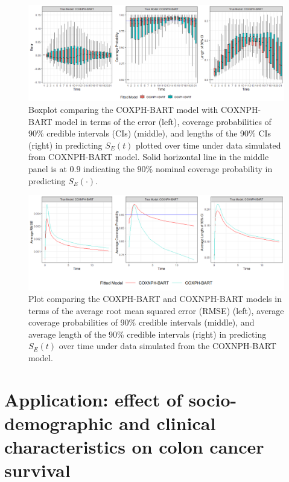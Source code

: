 \documentclass[12pt]{article}
\begin{document}
\begin{figure}
     \centering
     \includegraphics[width=\textwidth]{NPH_Boxplots.png}
     \caption{Boxplot comparing the COXPH-BART model with COXNPH-BART model in terms of the error (left),  coverage probabilities of 90\% credible intervals (CIs)  (middle), and lengths of the 90\% CIs (right) in predicting $S_E(t)$ plotted over time under data simulated from COXNPH-BART model. Solid horizontal line in the middle panel is at $0.9$ indicating the $90\%$ nominal coverage probability in predicting $S_E(\cdot).$}
     \label{fig:NPH-Boxplots}
 \end{figure}

 \begin{figure}
     \centering
     \includegraphics[width=\textwidth]{NPH-Plots.png}
     \caption{Plot comparing the COXPH-BART and COXNPH-BART models in terms of the average root mean squared error (RMSE) (left),  average coverage probabilities of 90\% credible intervals (middle), and average length of the 90\% credible intervals (right) in predicting $S_E(t)$ over time under data simulated from the COXNPH-BART model.}
     \label{fig:NPH-plots}
 \end{figure}


 \pagebreak
\section{Application: effect of socio-demographic and clinical characteristics on colon cancer survival}\label{sec:applications}
\end{document}

